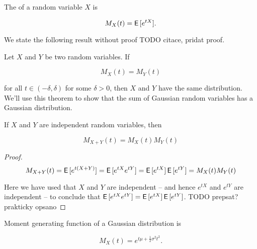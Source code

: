 \begin{defn}
    The  of a random variable $X$ is
    
    \begin{equation}
    M_X(t) = \operatorname{\textsf{E}\,}[e^{t X}].
    \end{equation}
\end{defn}

We state the following result without proof {TODO citace, pridat proof}.

\begin{thm}
    Let $X$ and $Y$ be two random variables. If
    
    \begin{equation}
    M_X(t) = M_Y(t)
    \end{equation}
    
    for all $t \in (-\delta, \delta)$ for some $\delta > 0$, then $X$ and $Y$ have the same distribution. We'll use this theorem to show that the sum of Gaussian random variables has a Gaussian distribution.
\end{thm}

\begin{thm}
    \citep{mitzenmacher2017probability}\label{thm:sum-independent-gaussian}
    If $X$ and $Y$ are independent random variables, then
    
    \begin{equation}
    M_{X + Y}(t) = M_X(t) M_Y(t)
    \end{equation}
    
    \begin{proof}
        \begin{equation}
        M_{X + Y}(t) = \operatorname{\textsf{E}\,}[e^{t(X + Y)}] = \operatorname{\textsf{E}\,}[e^{tX} e^{tY}] = \operatorname{\textsf{E}\,}[e^{tX}] \operatorname{\textsf{E}\,}[e^{tY}] = M_X(t) M_Y(t)
        \end{equation}
        
        Here we have used that $X$ and $Y$ are independent -- and hence $e^{tX}$ and $e^{tY}$ are independent -- to conclude that $\operatorname{\textsf{E}\,}[e^{tX} e^{tY}] = \operatorname{\textsf{E}\,}[e^{tX}] \operatorname{\textsf{E}\,}[e^{tY}]$. {TODO prepsat? prakticky opsano}
    \end{proof}
\end{thm}


\begin{thm}
    Moment generating function of a Gaussian distribution is
    
    \begin{equation}
        M_X(t) = e^{t \mu + \frac{1}{2}\sigma^2 t^2}.
    \end{equation}
\end{thm}

